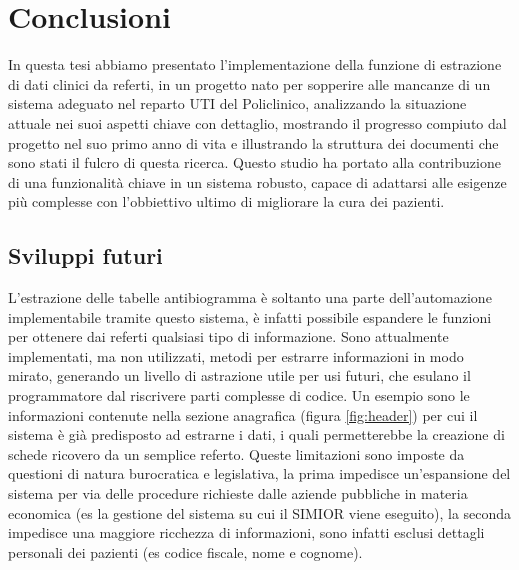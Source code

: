 \chapter{Conclusioni}
In questa tesi abbiamo presentato l'implementazione della funzione di estrazione di dati clinici da referti, in un progetto nato per sopperire alle mancanze di un sistema adeguato nel reparto UTI del Policlinico, analizzando la situazione attuale nei suoi aspetti chiave con dettaglio, mostrando il progresso compiuto dal progetto nel suo primo anno di vita e illustrando la struttura dei documenti che sono stati il fulcro di questa ricerca. Questo studio ha portato alla contribuzione di una funzionalità chiave in un sistema robusto, capace di adattarsi alle esigenze più complesse con l'obbiettivo ultimo di migliorare la cura dei pazienti.

\section{Sviluppi futuri}
L'estrazione delle tabelle antibiogramma è soltanto una parte dell'automazione implementabile tramite questo sistema, è infatti possibile espandere le funzioni per ottenere dai referti qualsiasi tipo di informazione. 
Sono attualmente implementati, ma non utilizzati, metodi per estrarre informazioni in modo mirato, generando un livello di astrazione utile per usi futuri, che esulano il programmatore dal riscrivere parti complesse di codice.
Un esempio sono le informazioni contenute nella sezione anagrafica (figura \ref{fig:header}) per cui il sistema è già predisposto ad estrarne i dati, i quali permetterebbe la creazione di schede ricovero da un semplice referto.
Queste limitazioni sono imposte da questioni di natura burocratica e legislativa, la prima impedisce un'espansione del sistema per via delle procedure richieste dalle aziende pubbliche in materia economica (es la gestione del sistema su cui il SIMIOR viene eseguito), la seconda impedisce una maggiore ricchezza di informazioni, sono infatti esclusi dettagli personali dei pazienti (es codice fiscale, nome e cognome). 

